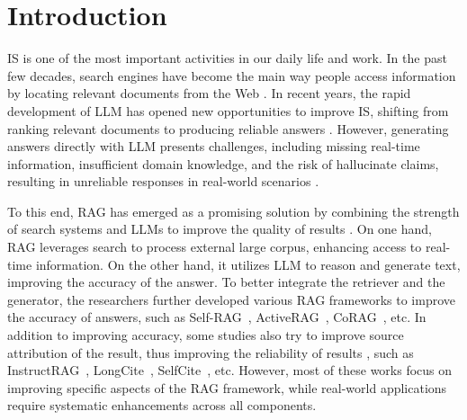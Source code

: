 \section{Introduction}
\Ac{IS} is one of the most important activities in our daily life and work. In the past few decades, search engines have become the main way people access information by locating relevant documents from the Web \cite{schutze2008introduction}. In recent years, the rapid development of \ac{LLM} has opened new opportunities to improve \ac{IS}, shifting from ranking relevant documents to producing reliable answers \cite{zhao2023survey}. 
However, generating answers directly with \ac{LLM} presents challenges, including missing real-time information, insufficient domain knowledge, and the risk of hallucinate claims, resulting in unreliable responses in real-world scenarios \cite{huang2024survey, tonmoy2024comprehensive, feng2023trends}.

To this end, \ac{RAG} has emerged as a promising solution by combining the strength of search systems and \acp{LLM} to improve the quality of results \cite{gao2023retrieval, zhao2024retrieval, li2024structrag}.
On one hand, \ac{RAG} leverages search to process external large corpus, enhancing access to real-time information. On the other hand, it utilizes \ac{LLM} to reason and generate text, improving the accuracy of the answer.
To better integrate the retriever and the generator, the researchers further developed various \ac{RAG} frameworks to improve the accuracy of answers, such as Self-RAG~\cite{asai2023self}, ActiveRAG~\cite{xu2024activerag}, CoRAG~\cite{wang2025chain}, etc.
In addition to improving accuracy, some studies also try to improve source attribution of the result, thus improving the reliability of results \cite{zhou2024trustworthiness, guan2025deeprag, friel2024ragbench}, such as InstructRAG~\cite{wei2024instructrag}, LongCite~\cite{zhang2024longcite}, SelfCite~\cite{chuang2025selfcite}, etc.
However, most of these works focus on improving specific aspects of the \ac{RAG} framework, while real-world applications require systematic enhancements across all components.
 
